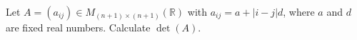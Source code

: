 Let \(A=(a_{ij})\in M_{(n+1)\times (n+1)}(\mathbb{R})\) with \(a_{ij}=a+|i-j|d\), where \(a\) and \(d\) are fixed real numbers.
Calculate \(\det(A)\).